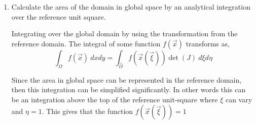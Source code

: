 \begin{enumerate}[label = \alph*., start = 1]
    \begin{figure}[h]
        \centering
        
        \caption{Global to Reference space transformation.}
        \label{fig:spaces}
    \end{figure}

    In order to compute the normal vectors in the global space with reference to the mid-points in the reference space, I will solve for the expressions for $\xi$ and $\eta$. Conducting this in Matlab and simplifying gives that $\xi$ and $\eta$ are,

    \begin{gather*}
        \xi = \\
        \eta = 
    \end{gather*}

    With $\xi$ and $\eta$ having been solved for, the normal vectors can be solved for by taking the gradient at the mid-points of the references as shown in Figure \ref{fig:spaces}. With the expressions for $\xi$ and $\eta$ in terms of $x$ and $y$ so taking the gradient at each respective reference midpoint through Matlab gives that the normal vectors are,

    \begin{fminipage}{0.3\linewidth}
        \begin{align*}
            
        \end{align*}    
    \end{fminipage}
    
    \pagebreak
    \item Calculate the area of the domain in global space by an analytical integration over the reference unit square.
    
    Integrating over the global domain by using the transformation from the reference domain. The integral of some function $f(\vec{x})$ transforms as,
    \begin{equation*}
        \int_{\Omega}f(\vec{x})\ dxdy = \int_{\hat{\Omega}}f\left(\vec{x}\left(\vec{\xi}\right)\right)\det{(J)}\ d\xi d\eta
    \end{equation*}

    Since the area in global space can be represented in the reference domain, then this integration can be simplified significantly. In other words this can be an integration above the top of the reference unit-square where $\xi$ can vary and $\eta = 1$. This gives that the function $f\left(\vec{x}\left(\vec{\xi}\right)\right)=1$
     

\end{enumerate}
